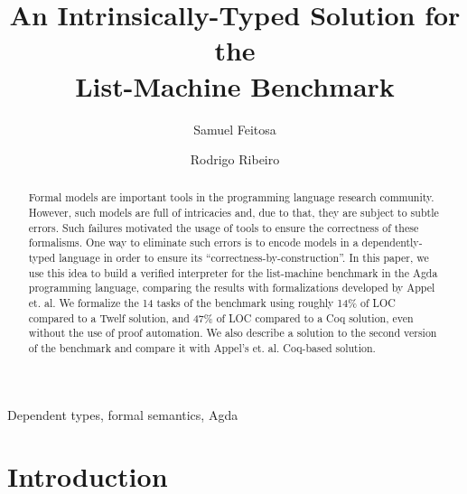 \documentclass[review]{elsarticle}
\theoremstyle{definition}
\begin{document}
\begin{frontmatter}

\title{An Intrinsically-Typed Solution for the\\ List-Machine Benchmark}

\author{Samuel Feitosa}
\address{%
  Departamento de Informática - Instituto Federal de Santa Catarina \\
  Caçador - Santa Catarina - Brazil
}

\author{Rodrigo Ribeiro}
\address{
  Prog. Pós Graduação em Ciência da Computação - Universidade Federal de Ouro Preto \\
  Ouro Preto - Minas Gerais - Brazil}



\begin{abstract}
Formal models are important tools in the programming language research
community. However, such models are full of intricacies and, due to that,
they are subject to subtle errors. Such failures motivated the usage of
tools to ensure the correctness of these formalisms. One way to eliminate
such errors is to encode models in a dependently-typed language in order
to ensure its ``correctness-by-construction''. In this paper, we use this
idea to build a verified interpreter for the list-machine benchmark in the
Agda programming language, comparing the results with formalizations developed
by Appel et. al. We formalize the 14 tasks of the benchmark
using roughly 14\% of LOC compared to a Twelf solution, and 47\% of LOC
compared to a Coq solution, even without the use of proof automation. We also
describe a solution to the second version of the benchmark and compare it with
Appel's et. al. Coq-based solution.
\end{abstract}


\begin{keyword}
Dependent types, formal semantics, Agda
\end{keyword}

\end{frontmatter}

\linenumbers






\section{Introduction}
\end{document}
